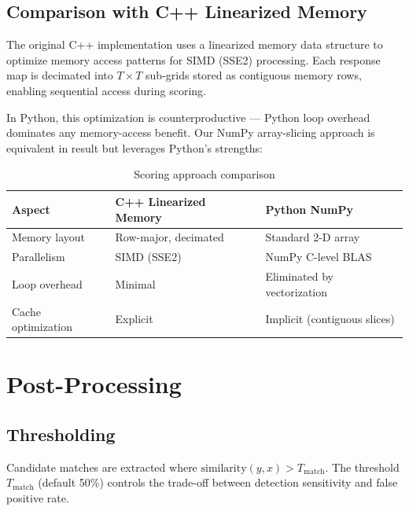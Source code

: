 \documentclass[12pt,a4paper]{article}
\begin{document}
\subsection{Comparison with C++ Linearized Memory}
The original C++ implementation uses a linearized memory data structure to optimize
memory access patterns for SIMD (SSE2) processing.  Each response map is decimated
into $T \times T$ sub-grids stored as contiguous memory rows, enabling sequential
access during scoring.

In Python, this optimization is counterproductive --- Python loop overhead dominates
any memory-access benefit.  Our NumPy array-slicing approach is equivalent in
result but leverages Python's strengths:

\begin{table}[H]
  \centering
  \caption{Scoring approach comparison}
  \label{tab:scoring}
  \begin{tabular}{lll}
    \toprule
    \textbf{Aspect}        & \textbf{C++ Linearized Memory} & \textbf{Python NumPy}        \\
    \midrule
    Memory layout          & Row-major, decimated           & Standard 2-D array           \\
    Parallelism            & SIMD (SSE2)                    & NumPy C-level BLAS           \\
    Loop overhead          & Minimal                        & Eliminated by vectorization  \\
    Cache optimization     & Explicit                       & Implicit (contiguous slices) \\
    \bottomrule
  \end{tabular}
\end{table}

\section{Post-Processing}

\subsection{Thresholding}
Candidate matches are extracted where $\text{similarity}(y,x) > T_\text{match}$.
The threshold $T_\text{match}$ (default 50\%) controls the trade-off between
detection sensitivity and false positive rate.
\end{document}
